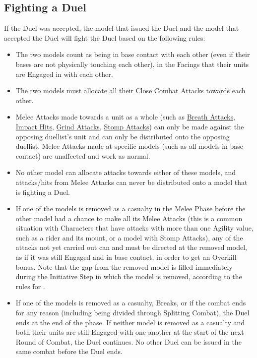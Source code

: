 \columnbreak

\subsection{Fighting a Duel}
\label{fighting_a_duel}

If the Duel was accepted, the model that issued the Duel and the model that accepted the Duel will fight the Duel based on the following rules:
\begin{itemize}
	\item The two models count as being in base contact with each other (even if their bases are not physically touching each other), in the Facings that their units are Engaged in with each other.
	\item The two models must allocate all their Close Combat Attacks towards each other.
	\item Melee Attacks made towards a unit as a whole (such as \hyperref[breath_attack]{Breath Attacks}, \hyperref[impact_hits]{Impact Hits}, \hyperref[grind_attacks]{Grind Attacks}, \hyperref[stomp_attacks]{Stomp Attacks}) can only be made against the opposing duellist's unit and can only be distributed onto the opposing duellist. Melee Attacks made at specific models (such as all models in base contact) are unaffected and work as normal.
	\item No other model can allocate attacks towards either of these models, and attacks/hits from Melee Attacks can never be distributed onto a model that is fighting a Duel.
	\item If one of the models is removed as a casualty in the Melee Phase before the other model had a chance to make all its Melee Attacks (this is a common situation with Characters that have attacks with more than one Agility value, such as a rider and its mount, or a model with Stomp Attacks), any of the attacks not yet carried out can and must be directed at the removed model, as if it was still Engaged and in base contact, in order to get an Overkill bonus. Note that the gap from the removed model is filled immediately during the Initiative Step in which the model is removed, according to the rules for .
	\item If one of the models is removed as a casualty, Breaks, or if the combat ends for any reason (including being divided through Splitting Combat), the Duel ends at the end of the phase. If neither model is removed as a casualty and both their units are still Engaged with one another at the start of the next Round of Combat, the Duel continues. No other Duel can be issued in the same combat before the Duel ends.
\end{itemize}

